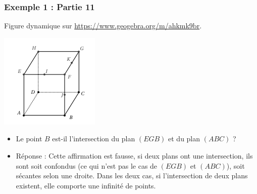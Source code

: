\documentclass[xcolor=svgnames,t,final]{beamer}
\begin{document}
\begin{frame}

\frametitle{Exemple 1 : Partie 11}

Figure dynamique sur \href{https://www.geogebra.org/m/ahkmk9br}{https://www.geogebra.org/m/ahkmk9br}.


\begin{center}
\includegraphics[scale=0.4]{images/exemple1.png}
\end{center}

\begin{itemize}
\pause \item {\color{blue}   Le point $B$ est-il l'intersection du plan $(EGB)$ et du plan $(ABC)$ ? }
\pause \item {\color{red} Réponse :  Cette affirmation est fausse,  si deux plans ont une intersection, ils sont soit confondus (ce qui n'est pas le cas de $(EGB)$ et  $(ABC)$), soit sécantes selon une droite. Dans les deux cas, si l'intersection de deux plans existent, elle comporte une infinité de points.
}
\end{itemize}


\end{frame}
\end{document}
